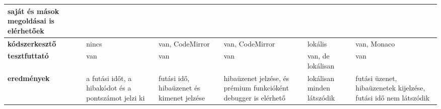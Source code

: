 {\begin{tabularx}{\textwidth}{@{}X|X|X|X|X|X@{}}
        saját és mások megoldásai is elérhetőek                                                                       \\ \hline
        \textbf{kódszerkesztő}                                                                                      &
        nincs                                                                                                       &
        van, CodeMirror                                                                                             &
        van, CodeMirror                                                                                             &
        lokális                                                                                                     &
        van, Monaco                                                                                                   \\ \hline
        \textbf{tesztfuttató}                                                                                       &
        van                                                                                                         &
        van                                                                                                         &
        van                                                                                                         &
        van, de lokálisan                                                                                           &
        van                                                                                                           \\ \hline
        \textbf{eredmények}                                                                                         &
        a futási időt, a hibakódot és a pontszámot jelzi ki                                                         &
        futási idő, hibaüzenet és kimenet jelzése                                                                   &
        hibaüzenet jelzése, és prémium funkcióként debugger is elérhető                                             &
        lokálisan minden látszódik                                                                                  &
        futási üzenet, hibaüzenetek kijelzése, futási idő nem látszódik
    \end{tabularx}
}



